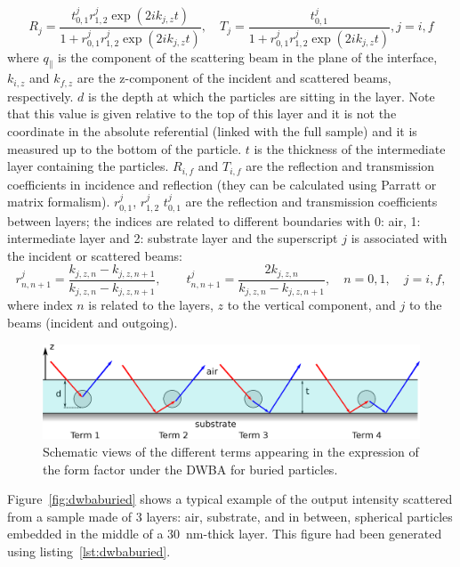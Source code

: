 \begin{equation*}
R_j =\frac{t^{j}_{0,1}r^{j}_{1,2}\exp(2ik_{j,z}t)}{1+r^{j}_{0,1}r^{j}_{1,2}\exp(2ik_{j,z}t)}, \quad T_j=\frac{t^{j}_{0,1}}{1+r^{j}_{0,1}r^{j}_{1,2}\exp(2ik_{j,z}t)}, j=i,f 
\end{equation*}
where $q_{\parallel}$ is the component of the scattering beam in the plane of the interface, $k_{i,z}$ and $k_{f,z}$ are the z-component of the incident and scattered beams, respectively.  $d$ is the depth at which the particles are sitting in the layer. Note that this value is given relative to the top of this layer and it is not the coordinate in the absolute referential (linked with the full sample) and it is measured up to the bottom of the particle. $t$ is the thickness of the intermediate layer containing the particles. $R_{i,f}$ and $T_{i,f}$  are the reflection  and transmission coefficients in incidence and reflection (they can be calculated using Parratt or matrix formalism). $r^j_{0,1}$, $r^j_{1,2}$ $t^j_{0,1}$ are the reflection and transmission coefficients between layers; the indices are related to different boundaries with 0: air, 1: intermediate layer and 2: substrate layer and the superscript $j$ is associated with the incident or scattered beams:
\begin{equation*}
r^j_{n,n+1}=\frac{k_{j,z,n}-k_{j,z,n+1}}{k_{j,z,n}-k_{j,z,n+1}}, \qquad t^j_{n,n+1}= \frac{2k_{j,z,n}}{k_{j,z,n}-k_{j,z,n+1}}, \quad n=0,1, \quad j=i,f,
\end{equation*}
where index $n$ is related to the layers, $z$ to the vertical component, and $j$ to the beams (incident and outgoing).

\begin{figure}[ht]
\begin{center}
\includegraphics[width=\textwidth]{Figures/drawing/drawingDWBAburied.eps}
\end{center}
\caption{Schematic views of the different terms appearing in the expression of the form factor under the DWBA for buried particles.}
\label{fig:SchemDWBAburied}
\end{figure}



Figure~\ref{fig:dwbaburied} shows a typical example of the output intensity scattered from a sample made of 3 layers: air, substrate, and in between, spherical particles embedded in the middle of a 30~nm-thick layer. This figure had been generated using listing~\ref{lst:dwbaburied}.


